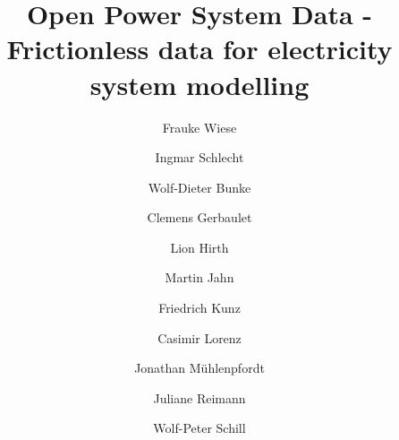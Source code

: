 \documentclass[article,sort&compress]{elsarticle}
\begin{document}
\begin{frontmatter}

\title{Open Power System Data - Frictionless data for electricity system modelling}

\author[dtu]{Frauke Wiese}

\author[basel,neon]{Ingmar Schlecht}

\author[euf]{Wolf-Dieter Bunke}

\author[tub]{Clemens Gerbaulet}

\author[neon,hsog,mercator]{Lion Hirth}

\author[euf]{Martin Jahn}

\author[diw,tennet]{Friedrich Kunz}

\author[tub,diw,sru]{Casimir Lorenz}

\author[neon,hu]{Jonathan M\"uhlenpfordt}

\author[neon,tub]{Juliane Reimann}

\author[diw]{Wolf-Peter Schill}

\address[dtu]{Technical University of Denmark, DTU Management Engineering, Produktionstorvet, Building 426, 2800 Kongens Lyngby, Denmark}
\address[basel]{University of Basel, Faculty of Business and Economics, Peter Merian-Weg 6, 4052 Basel, Switzerland}
\address[neon]{Neon Neue Energie\"okonomik GmbH (Neon), Karl-Marx-Platz 12, 12043 Berlin, Germany}
\address[euf]{Europa-Universit\"at Flensburg, Energy and Environmental Management, Auf dem Campus 1, 24943 Flensburg, Germany}
\address[tub]{Technische Universit\"at Berlin, Stra\ss{}e des 17. Juni 135, 10236 Berlin, Germany}
\address[hsog]{Hertie School of Governance, Friedrichstra{\ss}e 180, 10117 Berlin, Germany}
\address[mercator]{Mercator Research Institute on Global Commons and Climate Change, Torgauer Stra{\ss}e 12, 10829 Berlin}
\address[diw]{DIW Berlin, Mohrenstra{\ss}e 58, 10117 Berlin, Germany}
\address[tennet]{TenneT TSO GmbH, Bernecker Stra{\ss}e 70, 95448 Bayreuth}
\address[sru]{Sachverst\"andigen Rat f\"ur Umweltfragen, Luisenstra\ss{}e 46, 10117 Berlin, Germany}
\address[hu]{Humboldt-Universit\"at zu Berlin, School of Business and Economics, Spandauer Stra{\ss}e 1, 10178 Berlin, Germany}


\end{frontmatter}
\end{document}
